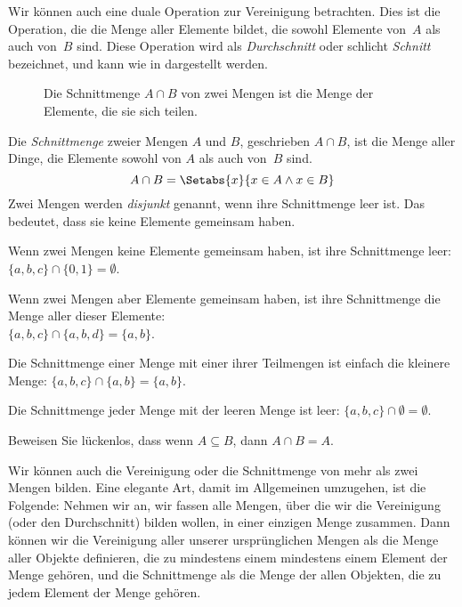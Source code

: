 \documentclass[../../../include/open-logic-section]{subfiles}
\begin{document}
\begin{explain}
Wir können auch eine \glqq duale\grqq{} Operation zur Vereinigung betrachten. Dies ist die
Operation, die die Menge aller Elemente bildet, die sowohl Elemente
von~$A$ als auch von~$B$ sind. Diese Operation wird als 
\emph{Durchschnitt} oder schlicht \emph{Schnitt} bezeichnet, und kann wie in  dargestellt werden.
\begin{figure}
  \caption{Die Schnittmenge $A \cap B$ von zwei Mengen ist die Menge der
    Elemente, die sie sich teilen.}
\end{figure}
\end{explain}

\begin{defn}[Schnittmenge]
Die \emph{Schnittmenge} zweier Mengen $A$ und $B$, geschrieben $A \cap B$, ist
die Menge aller Dinge, die Elemente sowohl von $A$ als auch von~$B$ sind.
\[
A \cap B = \Setabs{x}{x \in A \land x \in B}
\]
Zwei Mengen werden \emph{disjunkt} genannt, wenn ihre Schnittmenge
leer ist. Das bedeutet, dass sie keine Elemente gemeinsam haben.
\end{defn}

\begin{ex}
Wenn zwei Mengen keine Elemente gemeinsam haben, ist ihre Schnittmenge leer:
$\{ a, b, c\} \cap \{ 0, 1\} = \emptyset$.

Wenn zwei Mengen aber Elemente gemeinsam haben, ist ihre Schnittmenge die Menge
aller dieser Elemente:\\ $\{a, b, c \} \cap \{a, b, d \} = \{a, b\}$.

Die Schnittmenge einer Menge mit einer ihrer Teilmengen ist einfach die kleinere
Menge: $\{a, b, c\} \cap \{a, b\} = \{a, b\}$.

Die Schnittmenge jeder Menge mit der leeren Menge ist leer: $\{a, b, c \}
\cap \emptyset = \emptyset$.
\end{ex}

\begin{prob}
Beweisen Sie lückenlos, dass wenn $A \subseteq B$, dann $A \cap B = A$.
\end{prob}

\begin{explain}
Wir können auch die Vereinigung oder die Schnittmenge von mehr als zwei
Mengen bilden. Eine elegante Art, damit im Allgemeinen umzugehen, ist die Folgende:
Nehmen wir an, wir fassen alle Mengen, über die wir die Vereinigung (oder den Durchschnitt) bilden wollen,
in einer einzigen Menge zusammen. Dann können wir die Vereinigung
aller unserer ursprünglichen Mengen als die Menge aller Objekte definieren, die zu mindestens einem
mindestens einem Element der Menge gehören, und die Schnittmenge als die Menge der
allen Objekten, die zu jedem Element der Menge gehören.
\end{explain}
\end{document}
